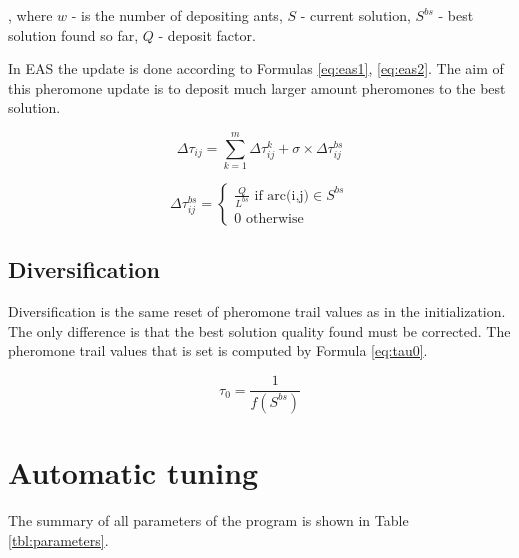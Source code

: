 \documentclass[12pt]{article}
\begin{document}
, where $w$ - is the number of depositing ants,
$S$ - current solution,
$S^{bs}$ - best solution found so far,
$Q$ - deposit factor.

In EAS the update is done according to Formulas \ref{eq:eas1}, \ref{eq:eas2}. The aim of this pheromone update is to deposit much larger amount pheromones to the best solution.

\begin{equation}
\Delta\tau_{ij} = \sum_{k=1}^{m} \Delta \tau_{ij}^k + \sigma \times \Delta\tau_{ij}^{bs}
\label{eq:eas1}
\end{equation}

\begin{equation}
\Delta\tau_{ij}^{bs} = \begin{cases}
    \frac{Q}{L^{bs}} \text{ if arc(i,j)} \in S^{bs}\\
    0 \text{ otherwise}
  \end{cases}
\label{eq:eas2}
\end{equation}

\subsection{Diversification}

Diversification is the same reset of pheromone trail values as in the initialization. The only difference is that the best solution quality found must be corrected. The pheromone trail values that is set is computed by Formula \ref{eq:tau0}.

\begin{equation}
\tau_0=\frac{1}{f(S^{bs})}
\label{eq:tau0}
\end{equation}

\section{Automatic tuning}

The summary of all parameters of the program is shown in Table \ref{tbl:parameters}.
\end{document}
